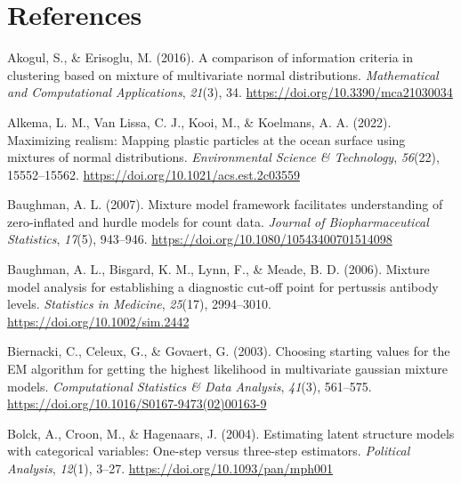 \documentclass[
  ,man,floatsintext]{apa6}
\newlength{\cslhangindent}
\newlength{\cslentryspacingunit} %
\newenvironment{CSLReferences}[2] %
 {%
  \setlength{\parindent}{0pt}
  \ifodd #1
  \let\oldpar\par
  \def\par{\hangindent=\cslhangindent\oldpar}
  \fi
  \setlength{\parskip}{#2\cslentryspacingunit}
 }%
 {}
\begin{document}
\newpage

\hypertarget{references}{%
\section*{References}\label{references}}

\hypertarget{refs}{}
\begin{CSLReferences}{1}{0}
\leavevmode{}%
Akogul, S., \& Erisoglu, M. (2016). A comparison of information criteria in clustering based on mixture of multivariate normal distributions. \emph{Mathematical and Computational Applications}, \emph{21}(3), 34. \url{https://doi.org/10.3390/mca21030034}

\leavevmode{}%
Alkema, L. M., Van Lissa, C. J., Kooi, M., \& Koelmans, A. A. (2022). Maximizing realism: Mapping plastic particles at the ocean surface using mixtures of normal distributions. \emph{Environmental Science \& Technology}, \emph{56}(22), 15552--15562. \url{https://doi.org/10.1021/acs.est.2c03559}

\leavevmode{}%
Baughman, A. L. (2007). Mixture model framework facilitates understanding of zero-inflated and hurdle models for count data. \emph{Journal of Biopharmaceutical Statistics}, \emph{17}(5), 943--946. \url{https://doi.org/10.1080/10543400701514098}

\leavevmode{}%
Baughman, A. L., Bisgard, K. M., Lynn, F., \& Meade, B. D. (2006). Mixture model analysis for establishing a diagnostic cut-off point for pertussis antibody levels. \emph{Statistics in Medicine}, \emph{25}(17), 2994--3010. \url{https://doi.org/10.1002/sim.2442}

\leavevmode{}%
Biernacki, C., Celeux, G., \& Govaert, G. (2003). Choosing starting values for the {EM} algorithm for getting the highest likelihood in multivariate gaussian mixture models. \emph{Computational Statistics \& Data Analysis}, \emph{41}(3), 561--575. \url{https://doi.org/10.1016/S0167-9473(02)00163-9}

\leavevmode{}%
Bolck, A., Croon, M., \& Hagenaars, J. (2004). Estimating latent structure models with categorical variables: One-step versus three-step estimators. \emph{Political Analysis}, \emph{12}(1), 3--27. \url{https://doi.org/10.1093/pan/mph001}


\end{CSLReferences}
\end{document}
